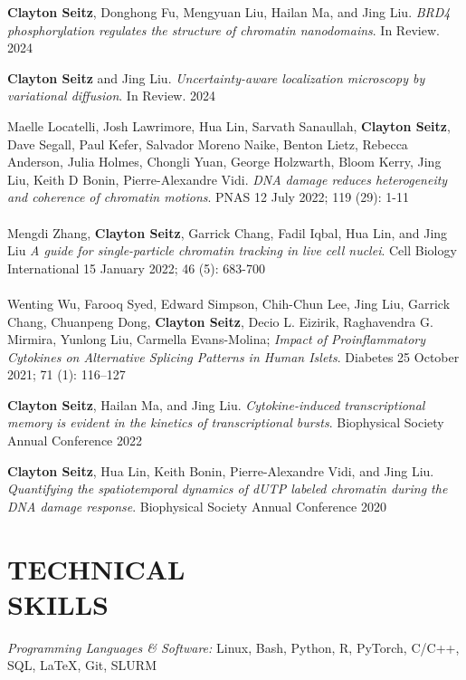 \documentclass[margin, 10pt]{res} %
\begin{document}
\begin{resume}
\textbf{Clayton Seitz}\textsuperscript{\textdagger}, Donghong Fu\textsuperscript{\textdagger}, Mengyuan Liu, Hailan Ma, and Jing Liu. \textit{BRD4 phosphorylation regulates the structure of chromatin nanodomains}. In Review. 2024

\textbf{Clayton Seitz} and Jing Liu. \textit{Uncertainty-aware localization microscopy by variational diffusion}. In Review. 2024

Maelle Locatelli\textsuperscript{\textdagger}, Josh Lawrimore\textsuperscript{\textdagger}, Hua Lin\textsuperscript{\textdagger}, Sarvath Sanaullah, \textbf{Clayton Seitz}, Dave Segall, Paul Kefer, Salvador Moreno Naike, Benton Lietz, Rebecca Anderson, Julia Holmes, Chongli Yuan, George Holzwarth, Bloom Kerry, Jing Liu, Keith D Bonin, Pierre-Alexandre Vidi. \textit{DNA damage reduces heterogeneity and coherence of chromatin motions}. PNAS 12 July 2022; 119 (29): 1-11
\\
\\
Mengdi Zhang, \textbf{Clayton Seitz}, Garrick Chang, Fadil Iqbal, Hua Lin, and Jing Liu \textit{A guide for single-particle chromatin tracking in live cell nuclei}. Cell Biology International 15 January 2022; 46 (5): 683-700
\\
\\
Wenting Wu, Farooq Syed, Edward Simpson, Chih-Chun Lee, Jing Liu, Garrick Chang, Chuanpeng Dong, \textbf{Clayton Seitz}, Decio L. Eizirik, Raghavendra G. Mirmira, Yunlong Liu, Carmella Evans-Molina; \textit{Impact of Proinflammatory Cytokines on Alternative Splicing Patterns in Human Islets}. Diabetes 25 October 2021; 71 (1): 116–127

\textbf{Clayton Seitz}, Hailan Ma, and Jing Liu. \textit{Cytokine-induced transcriptional memory is evident in the kinetics of transcriptional bursts}. Biophysical Society Annual Conference 2022


\textbf{Clayton Seitz}, Hua Lin, Keith Bonin, Pierre-Alexandre Vidi, and Jing Liu. \textit{Quantifying the spatiotemporal dynamics of dUTP labeled chromatin during the DNA damage response}. Biophysical Society Annual Conference 2020


\section{TECHNICAL \\ SKILLS} 

{\sl Programming Languages \& Software:} 
Linux, Bash, Python, R, PyTorch, C/C++, SQL, LaTeX, Git, SLURM\\

\end{resume}
\end{document}
